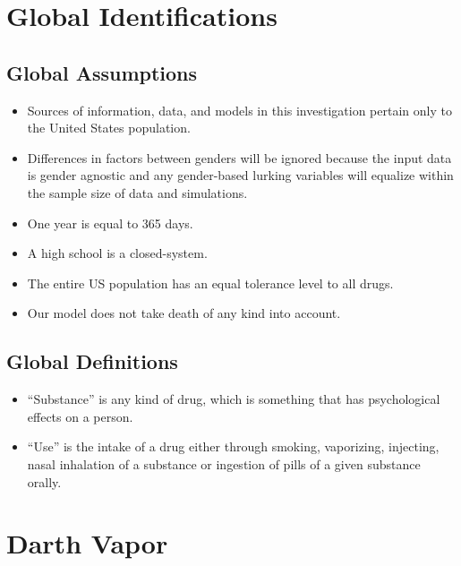 \documentclass[12pt,letterpaper]{article}
\begin{document}
\newpage
\tableofcontents

\newpage
\section{Global Identifications}
\subsection{Global Assumptions}
\begin{itemize}
  \item Sources of information, data, and models in this investigation pertain only to the United States population.
  \item Differences in factors between genders will be ignored because the input data is gender agnostic and any gender-based lurking variables will equalize within the sample size of data and simulations.
  \item One year is equal to 365 days.
  \item A high school is a closed-system.
  \item The entire US population has an equal tolerance level to all drugs.
  \item Our model does not take death of any kind into account.
\end{itemize}

\subsection{Global Definitions}
\begin{itemize}
\item “Substance” is any kind of drug, which is something that has psychological effects on a person.
\item “Use” is the intake of a drug either through smoking, vaporizing, injecting, nasal inhalation of a substance or ingestion of pills of a given substance orally.
\end{itemize}

\section{Darth Vapor}
\end{document}
